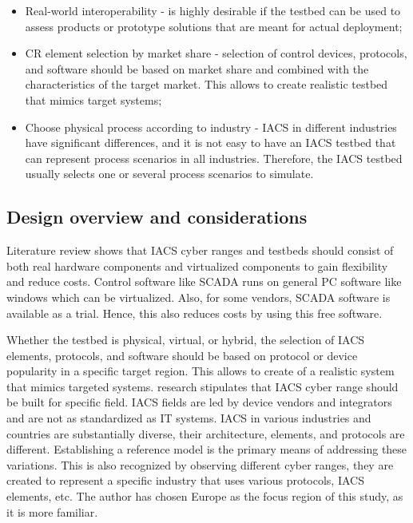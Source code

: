 \begin{itemize}
	\item Real-world interoperability - is highly desirable if the testbed can be used to assess products or prototype solutions that are meant for actual deployment;
	
	\item CR element selection by market share - selection of control devices, protocols, and software should be based on market share and combined with the characteristics of the target market. This allows to create realistic testbed that mimics target systems;
	
	\item Choose physical process according to industry - IACS in different industries have significant differences, and it is not easy to have an IACS testbed that can represent process scenarios in all industries. Therefore, the IACS testbed usually selects one or several process scenarios to simulate.
	
\end{itemize}

\subsection{Design overview and considerations} \label{sec:design-ower}

Literature review shows that IACS cyber ranges and testbeds should consist of both real hardware components and virtualized components to gain flexibility and reduce costs. \citeauthor{42-surway-australi-unclasified} \parencite{42-surway-australi-unclasified} Control software like SCADA runs on general PC software like windows which can be virtualized. Also, for some vendors, SCADA software is available as a trial. Hence, this also reduces costs by using this free software.

Whether the testbed is physical, virtual, or hybrid, the selection of IACS elements, protocols, and software should be based on protocol or device popularity in a specific target region. This allows to create of a realistic system that mimics targeted systems.  \parencite{35-ten-lessons-ics-testbeds} research stipulates that IACS cyber range should be built for specific field. IACS fields are led by device vendors and integrators and are not as standardized as IT systems. IACS in various industries and countries are substantially diverse, their architecture, elements, and protocols are different. Establishing a reference model is the primary means of addressing these variations. This is also recognized by observing different cyber ranges, they are created to represent a specific industry that uses various protocols, IACS elements, etc. The author has chosen Europe as the focus region of this study, as it is more familiar.

